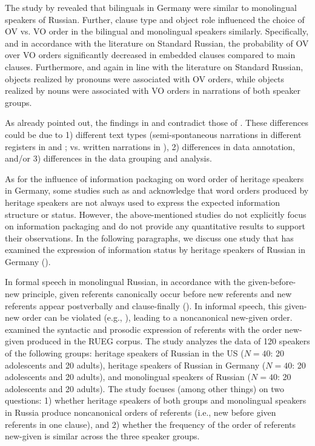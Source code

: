 \documentclass[output=paper,colorlinks,citecolor=brown]{langscibook}
\begin{document}
The study by \citet{martynova_ovvo_nodate} revealed that bilinguals in Germany were similar to monolingual speakers of Russian. Further, clause type and object role influenced the choice of OV vs. VO order in the bilingual and monolingual speakers similarly. Specifically, and in accordance with the literature on Standard Russian, the probability of OV over VO orders significantly decreased in embedded clauses compared to main clauses. Furthermore, and again in line with the literature on Standard Russian, objects realized by pronouns were associated with OV orders, while objects realized by nouns were associated with VO orders in narrations of both speaker groups.\largerpage

As already pointed out, the findings in \citet{zuban_word_2021} and \citet{martynova_ovvo_nodate} contradict those of \citet{brehmer_lets_2015}. These differences could be due to 1) different text types (semi-spontaneous narrations in different registers in \citet{zuban_word_2021} and \citet{martynova_ovvo_nodate}; vs. written narrations in \citet{brehmer_lets_2015}), 2) differences in data annotation, and/or 3) differences in the data grouping and analysis.

As for the influence of information packaging on word order of heritage speakers in Germany, some studies such as \citet{zuban_word_2021} and \citet{brehmer_lets_2015} acknowledge that word orders produced by heritage speakers are not always used to express the expected information structure or status. However, the above-mentioned studies do not explicitly focus on information packaging and do not provide any quantitative results to support their observations. In the following paragraphs, we discuss one study that has examined the expression of information status by heritage speakers of Russian in Germany (\cite{zuban_unexpected_2023}).

In formal speech in monolingual Russian, in accordance with the given-before-new principle, given referents canonically occur before new referents and new referents appear postverbally and clause-finally (\cite{slioussar_grammar_2007, slioussar_processing_2011}). In informal speech, this given-new order can be violated (e.g., \cite{sirotinina_porjadok_2003}), leading to a noncanonical new-given order. \citet{zuban_unexpected_2023} examined the syntactic and prosodic expression of referents with the order new-given produced in the RUEG corpus. The study analyzes the data of 120 speakers of the following groups: heritage speakers of Russian in the US ($N=40$: 20 adolescents and 20 adults), heritage speakers of Russian in Germany ($N=40$: 20 adolescents and 20 adults), and monolingual speakers of Russian ($N=40$: 20 adolescents and 20 adults). The study focuses (among other things) on two questions: 1) whether heritage speakers of both groups and monolingual speakers in Russia produce noncanonical orders of referents (i.e., new before given referents in one clause), and 2) whether the frequency of the order of referents new-given is similar across the three speaker groups. 
\end{document}
